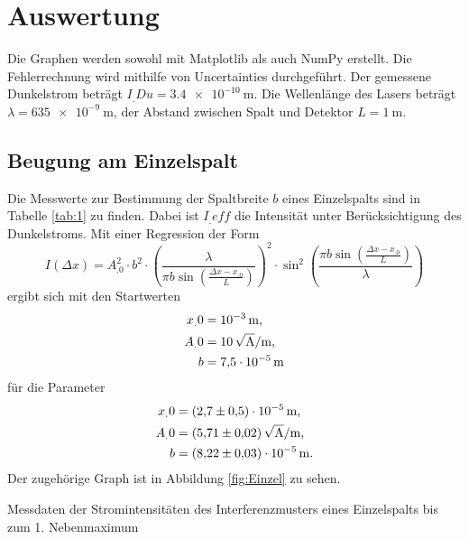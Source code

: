 \section{Auswertung}
\label{sec:Auswertung}


Die Graphen werden sowohl mit Matplotlib \cite{matplotlib} als auch NumPy \cite{numpy} erstellt. Die Fehlerrechnung wird mithilfe von Uncertainties \cite{uncertainties} 
durchgeführt.
\newline\newline
Der gemessene Dunkelstrom beträgt $I_.{Du}=\SI{3,4e-10}{\metre}$.
Die Wellenlänge des Lasers beträgt $\lambda = \SI{635e-9}{\metre}$, der Abstand zwischen Spalt und Detektor $L=\SI{1}{\metre}$.
\subsection{Beugung am Einzelspalt}

Die Messwerte zur Bestimmung der Spaltbreite $b$ eines Einzelspalts sind in Tabelle \ref{tab:1} zu finden. Dabei ist $I_.{eff}$ die Intensität unter Berücksichtigung des Dunkelstroms.
Mit einer Regression der Form 
\[
I(\Delta x)=A^2_.0\cdot b^2\cdot\left(
\frac{\lambda}{\pi b \sin{\left(\frac{\Delta x-x_.0}{L}\right)}}\right)^2\cdot\sin^2{\left(\frac{\pi b\sin{\left(\frac{\Delta x-x_.0}{L}\right)}}{\lambda}\right)}
\]
ergibt sich mit den Startwerten
\begin{align*}
x_.0	&=\SI{e-3}{\metre}\text{,}\\
A_.0	&=\SI{10}{\sqrt{\ampere}\per\metre}\text{,}\\
b		&=\SI{7,5e-5}{\metre}\\
\end{align*}
für die Parameter
\begin{align*}
x_.0&= \SI{2,7(5)e-5}{\metre}\text{,} \\
A_.0&= \SI{5,71(2)}{\sqrt{\ampere}\per\metre}\text{,} \\
b   &= \SI{8,22(3)e-5}{\metre}\text{.} \\
\end{align*}
Der zugehörige Graph ist in Abbildung \ref{fig:Einzel} zu sehen.

\begin{table}
\caption{Messdaten der Stromintensitäten des Interferenzmusters eines Einzelspalts bis zum 1. Nebenmaximum}


\label{tab:1}
\end{table}

